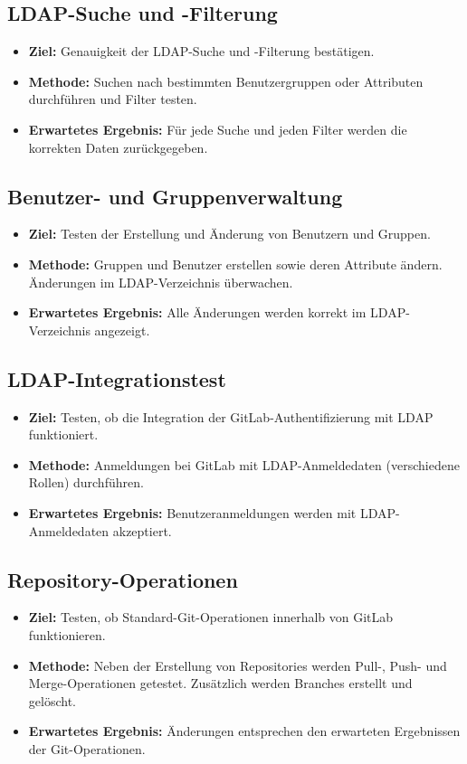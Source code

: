 \documentclass[a4paper,12pt]{article}
\begin{document}
\subsection*{LDAP-Suche und -Filterung}
\begin{itemize}[label=--]
	\item \textbf{Ziel:} Genauigkeit der LDAP-Suche und -Filterung bestätigen.
	\item \textbf{Methode:} Suchen nach bestimmten Benutzergruppen oder Attributen durchführen und Filter testen.
	\item \textbf{Erwartetes Ergebnis:} Für jede Suche und jeden Filter werden die korrekten Daten zurückgegeben.
\end{itemize}

\subsection*{Benutzer- und Gruppenverwaltung}
\begin{itemize}[label=--]
	\item \textbf{Ziel:} Testen der Erstellung und Änderung von Benutzern und Gruppen.
	\item \textbf{Methode:} Gruppen und Benutzer erstellen sowie deren Attribute ändern. Änderungen im LDAP-Verzeichnis überwachen.
	\item \textbf{Erwartetes Ergebnis:} Alle Änderungen werden korrekt im LDAP-Verzeichnis angezeigt.
\end{itemize}

\subsection*{LDAP-Integrationstest}
\begin{itemize}[label=--]
	\item \textbf{Ziel:} Testen, ob die Integration der GitLab-Authentifizierung mit LDAP funktioniert.
	\item \textbf{Methode:} Anmeldungen bei GitLab mit LDAP-Anmeldedaten (verschiedene Rollen) durchführen.
	\item \textbf{Erwartetes Ergebnis:} Benutzeranmeldungen werden mit LDAP-Anmeldedaten akzeptiert.
\end{itemize}

\subsection*{Repository-Operationen}
\begin{itemize}[label=--]
	\item \textbf{Ziel:} Testen, ob Standard-Git-Operationen innerhalb von GitLab funktionieren.
	\item \textbf{Methode:} Neben der Erstellung von Repositories werden Pull-, Push- und Merge-Operationen getestet. Zusätzlich werden Branches erstellt und gelöscht.
	\item \textbf{Erwartetes Ergebnis:} Änderungen entsprechen den erwarteten Ergebnissen der Git-Operationen.
\end{itemize}
\end{document}
